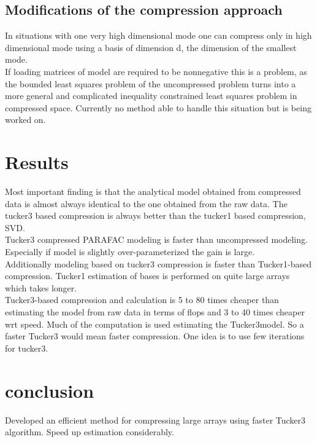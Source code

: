 \documentclass[10pt, draft]{article}
\begin{document}
\subsection{Modifications of the compression approach}
In situations with one very high dimensional mode one can compress only in high dimensional mode using a basis of dimension d, the dimension of the smallest mode.  \\
If loading matrices of model are required to be nonnegative this is a problem, as the bounded least squares problem of the uncompressed problem turns into a more general and complicated inequality constrained least squares problem in compressed space.  Currently no method able to handle this situation but is being worked on.

\section{Results}
Most important finding is that the analytical model obtained from compressed data is almost always identical to the one obtained from the raw data.  The tucker3 based compression is always better than the tucker1 based compression, SVD.\\
Tucker3 compressed PARAFAC modeling is faster than uncompressed modeling. Especially if model is slightly over-parameterized the gain is large.\\
Additionally modeling based on tucker3 compression is faster than Tucker1-based compression.  Tucker1 estimation of bases is performed on quite large arrays which takes longer.  \\
Tucker3-based compression and calculation is 5 to 80 times cheaper than estimating the model from raw data in terms of flops and 3 to 40 times cheaper wrt speed.  Much of the computation is used estimating the Tucker3model.  So a faster Tucker3 would mean faster compression.  One idea is to use few iterations for tucker3.  

\section{conclusion}
Developed an efficient method for compressing large arrays using faster Tucker3 algorithm.  Speed up estimation considerably. 
\end{document}
